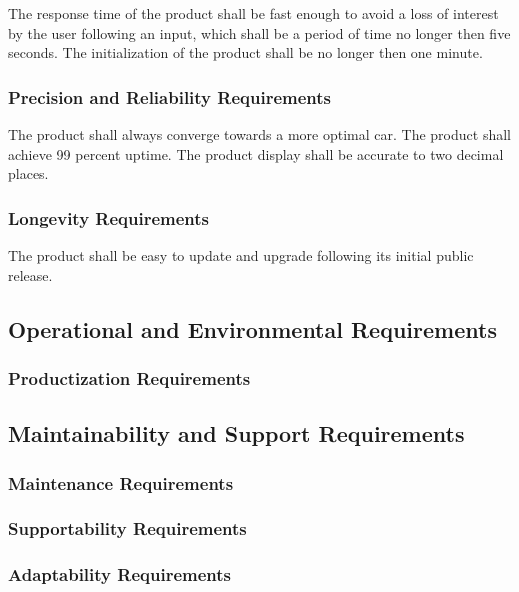 \documentclass[12pt, titlepage]{article}
\begin{document}
The response time of the product shall be fast enough to avoid a loss of 
interest by the user following an input, which shall be a period of time no 
longer then five seconds. The initialization of the product shall be no longer 
then one minute.

\subsubsection{Precision and Reliability Requirements}

The product shall always converge towards a more optimal car. The product shall 
achieve 99 percent uptime. The product display shall be accurate to two decimal 
places.

\subsubsection{Longevity Requirements}

The product shall be easy to update and upgrade following its initial public 
release. 

\subsection{Operational and Environmental Requirements}

\subsubsection{Productization Requirements}

\subsection{Maintainability and Support Requirements}

\subsubsection{Maintenance Requirements}

\subsubsection{Supportability Requirements}

\subsubsection{Adaptability Requirements}
\end{document}
